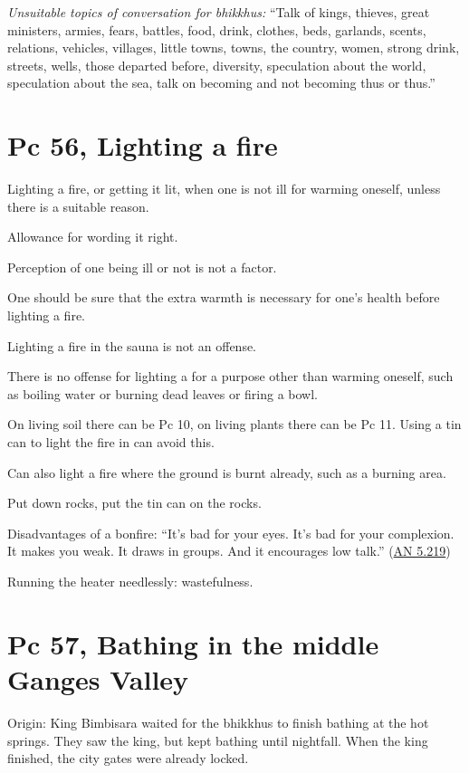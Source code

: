 \emph{Unsuitable topics of conversation for bhikkhus:} ``Talk of kings,
thieves, great ministers, armies, fears, battles, food, drink, clothes,
beds, garlands, scents, relations, vehicles, villages, little towns,
towns, the country, women, strong drink, streets, wells, those departed
before, diversity, speculation about the world, speculation about the
sea, talk on becoming and not becoming thus or thus.''

\section{Pc 56, Lighting a fire}

Lighting a fire, or getting it lit, when one is not ill for warming
oneself, unless there is a suitable reason.

Allowance for wording it right.

Perception of one being ill or not is not a factor.

One should be sure that the extra warmth is necessary for one's health
before lighting a fire.

Lighting a fire in the sauna is not an offense.

\enlargethispage{\baselineskip}

There is no offense for lighting a for a purpose other than warming
oneself, such as boiling water or burning dead leaves or firing a bowl.

On living soil there can be Pc 10, on living plants there can be Pc 11.
Using a tin can to light the fire in can avoid this.

Can also light a fire where the ground is burnt already, such as a
burning area.

Put down rocks, put the tin can on the rocks.

Disadvantages of a bonfire: ``It's bad for your eyes. It's bad for your
complexion. It makes you weak. It draws in groups. And it encourages low
talk.'' (\href{https://suttacentral.net/an5.219/en/sujato}{AN 5.219})

Running the heater needlessly: wastefulness.

\section{Pc 57, Bathing in the middle Ganges Valley}

Origin: King Bimbisara waited for the bhikkhus to finish bathing at the
hot springs. They saw the king, but kept bathing until nightfall. When
the king finished, the city gates were already locked.


